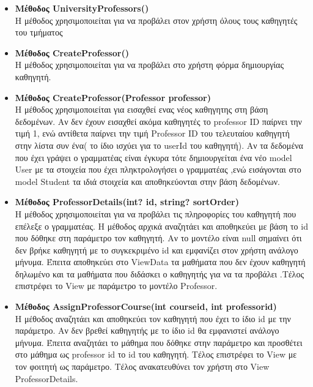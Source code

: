 \documentclass[12pt]{article}
\begin{document}
\begin{itemize}
		\item \textbf{Μέθοδος UniversityProfessors()}\\
		Η μέθοδος χρησιμοποιείται για να προβάλει στον χρήστη όλους τους καθηγητές του τμήματος
		
		\item \textbf{Μέθοδος CreateProfessor()}\\
		Η μέθοδος χρησιμοποιείται για να προβάλει στο χρήστη φόρμα δημιουργίας καθηγητή.
				
		\item \textbf{Μέθοδος CreateProfessor(Professor professor)}\\
		Η μέθοδος χρησιμοποιείται για εισαχθεί ενας νέος καθηγητης στη βάση δεδομένων. Αν δεν έχουν εισαχθεί ακόμα καθηγητές το  professor ID παίρνει την τιμή 1, ενώ αντίθετα παίρνει την τιμή Professor ID του τελευταίου καθηγητή στην λίστα συν ένα( το ίδιο ισχύει για το userId του καθηγητή). Αν τα δεδομένα που έχει γράψει ο γραμματέας είναι έγκυρα τότε δημιουργείται ένα νέο model User με τα στοιχεία που έχει πληκτρολογήσει ο γραμματέας ,ενώ εισάγονται στο model Student τα ιδιά στοιχεία και αποθηκεύονται στην βάση δεδομένων.


		\item \textbf{Μέθοδος ProfessorDetails(int? id, string? sortOrder)}\\
		Η μέθοδος χρησιμοποιείται για να προβάλει τις πληροφορίες του καθηγητή που επέλεξε ο γραμματέας. Η μέθοδος αρχικά αναζητάει και αποθηκεύει με βάση το id που δόθηκε στη παράμετρο τον καθηγητή. Αν το μοντέλο είναι null σημαίνει ότι δεν βρήκε καθηγητή με το συγκεκριμένο id και εμφανίζει στον χρήστη ανάλογο μήνυμα. Έπειτα αποθηκεύει στο ViewData τα  μαθήματα που δεν έχουν καθηγητή δηλωμένο και τα μαθήματα που διδάσκει ο καθηγητής  για να τα προβάλει .Τέλος επιστρέφει το View με παράμετρο το μοντέλο Professor.
		
		\item \textbf{Μέθοδος AssignProfessorCourse(int courseid, int professorid)}\\
		Η μέθοδος αναζητάει και αποθηκεύει τον καθηγητή που έχει το ίδιο id με την παράμετρο. Αν δεν βρεθεί καθηγητής με το ίδιο id θα εμφανιστεί ανάλογο μήνυμα. Έπειτα αναζητάει το μάθημα που δόθηκε στην παράμετρο και προσθέτει στο μάθημα ως professor id το id του καθηγητή. Τέλος επιστρέφει το View με τον φοιτητή ως παράμετρο. Τέλος ανακατευθύνει τον χρήστη στο View ProfessorDetails.
		
	\end{itemize}
	
\end{document}

